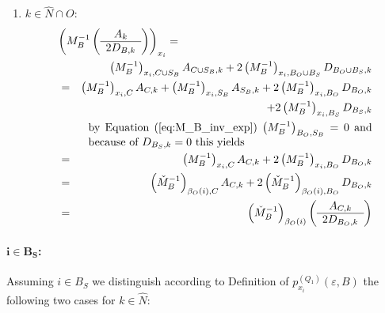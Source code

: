 \documentclass[a4paper]{article}
\begin{document}
\begin{enumerate}
\item $k \in \hat{N} \cap O$:
\begin{eqnarray}
\label{eq:r1_i_B_O_k_N_O}
\lefteqn{\left(M_{B}^{-1}
           \left(\begin{array}{c}
                   A_{k} \\
	           \hline
	           2D_{B, k}
	         \end{array}
           \right)
         \right)_{x_{i}}
=} \nonumber \\
&&
\left(M_{B}^{-1}\right)_{x_{i}, C \cup S_{B}}A_{C \cup S_{B}, k}
+2\left(M_{B}^{-1}\right)_{x_{i}, B_{O} \cup B_{S}}D_{B_{O} \cup B_{S}, k}
\nonumber \\
&=&
\left(M_{B}^{-1}\right)_{x_{i}, C}A_{C, k}
+\left(M_{B}^{-1}\right)_{x_{i}, S_{B}}A_{S_{B}, k}
+2\left(M_{B}^{-1}\right)_{x_{i}, B_{O}}D_{B_{O}, k}
\nonumber \\
&&
+2\left(M_{B}^{-1}\right)_{x_{i}, B_{S}}D_{B_{S}, k}
\nonumber \\
&&\begin{minipage}{9cm}
by Equation~(\ref{eq:M_B_inv_exp}) $\left(M_{B}^{-1}\right)_{B_{O}, S_{B}}=0$
and because of $D_{B_{S},k}=0$ this yields 
\end{minipage}
\nonumber \\
&=&
\left(M_{B}^{-1}\right)_{x_{i}, C}A_{C, k}
+2\left(M_{B}^{-1}\right)_{x_{i}, B_{O}}D_{B_{O}, k}
\nonumber \\
&=&
\left(\check{M}_{B}^{-1}\right)_{\beta_{O}(i),C}A_{C,k}
+2\left(\check{M}_{B}^{-1}\right)_{\beta_{O}(i), B_{O}}D_{B_{O}, k}
\nonumber \\
&=&
\left(\check{M}_{B}^{-1}\right)_{\beta_{O}(i)}
\left(\begin{array}{c}
        A_{C, k} \\
	\hline
	2D_{B_{O}, k}
      \end{array}
\right)
\end{eqnarray}
\end{enumerate}


\paragraph{$\mathbf{i \in B_{S}}$:}
Assuming $i \in B_{S}$ we distinguish
according to Definition of $p_{x_{i}}^{(Q_{1})}(\varepsilon, B)$
the following two cases for $k \in \hat{N}$:
\end{document}
